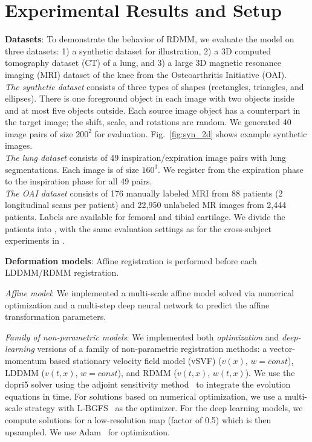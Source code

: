 \documentclass{article}
\numberwithin{equation}{section}
\newcommand{\zy}[1]{{\color{black}{#1}}}
\begin{document}
\section{Experimental Results and Setup}
\label{sec:experimental_results}
 {\bf Datasets}: To demonstrate the behavior of RDMM, we evaluate the model on three datasets: 1) a synthetic dataset for illustration, 2) a 3D computed tomography dataset (CT) of a lung, and 3) a large 3D magnetic resonance imaging (MRI) dataset of the knee from the Osteoarthritis Initiative (OAI).\\
{\it The synthetic dataset} consists of three types of shapes (rectangles, triangles, and ellipses). There is one foreground object in each image with two objects inside and at most five objects outside. Each source image object  has a counterpart in the target image; the shift, scale, and rotations are random. We generated 40 image pairs of size $200^2$ for evaluation. Fig.~\ref{fig:syn_2d} shows example synthetic images.\\
{\it The lung dataset} consists of 49 inspiration/expiration image pairs with lung segmentations. Each image is of size $160^3$. We register from the expiration phase to the inspiration phase for all 49 pairs.\\
{\it The OAI dataset} consists of 176 manually labeled MRI from 88 patients (2 longitudinal scans per patient) and 22,950 unlabeled MR images from 2,444 patients. Labels are available for femoral and tibial cartilage. We divide the patients into \zy{training (2,800 pairs),  validation (50 pairs) and testing groups (300 pairs)}, with the same evaluation settings as for the cross-subject experiments in \cite{shen2019networks}.

{\bf Deformation models}: Affine registration is performed before each LDDMM/RDMM registration.

{\it Affine model}:
We implemented a multi-scale affine model solved via numerical optimization and a multi-step deep neural network to predict the affine transformation parameters.

{\it Family of non-parametric models}: We implemented both {\it optimization} and {\it deep-learning} versions of a family of non-parametric registration methods: a vector-momentum based stationary velocity field model (vSVF) ($v(x)$, $w=const$), LDDMM ($v(t,x)$, $w=const$), and RDMM ($v(t,x)$, $w(t,x)$). We use the dopri5 solver using the adjoint sensitivity method~\citep{chen2018neural} to integrate the evolution equations in time. For solutions based on numerical optimization, we use a multi-scale strategy with L-BGFS~\cite{liu1989limited} as the optimizer. For the deep learning models, we compute solutions for a low-resolution map (factor of 0.5) which is then upsampled. We use Adam~\cite{kingma2014adam} for optimization.
\end{document}
